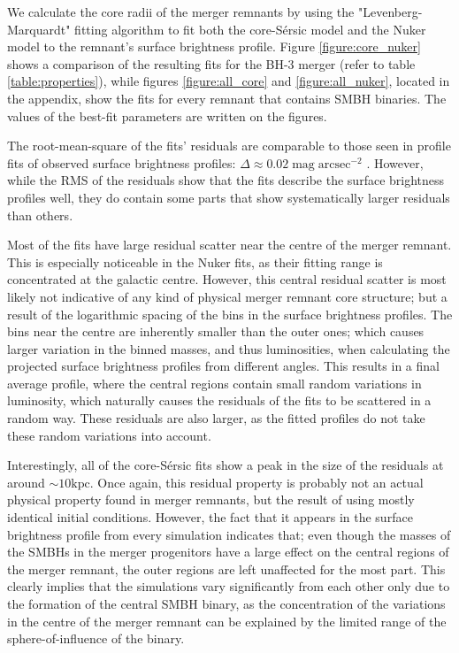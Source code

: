 \documentclass[english, oneside]{HYgradu}
\begin{document}
We calculate the core radii of the merger remnants by using the "Levenberg-Marquardt" fitting algorithm to fit both the core-Sérsic model and the Nuker model to the remnant's surface brightness profile. Figure \ref{figure:core_nuker} shows a comparison of the resulting fits for the BH-3 merger (refer to table \ref{table:properties}), while figures \ref{figure:all_core} and \ref{figure:all_nuker}, located in the appendix, show the fits for every remnant that contains SMBH binaries. The values of the best-fit parameters are written on the figures.

The root-mean-square of the fits' residuals are comparable to those seen in profile fits of observed surface brightness profiles: $\Delta \approx 0.02 \; \mathrm{mag \; arcsec^{-2}}$ \citep{Dullo2012}. However, while the RMS of the residuals show that the fits describe the surface brightness profiles well, they do contain some parts that show systematically larger residuals than others. 

Most of the fits have large residual scatter near the centre of the merger remnant. This is especially noticeable in the Nuker fits, as their fitting range is concentrated at the galactic centre. However, this central residual scatter is most likely not indicative of any kind of physical merger remnant core structure; but a result of the logarithmic spacing of the bins in the surface brightness profiles. The bins near the centre are inherently smaller than the outer ones; which causes larger variation in the binned masses, and thus luminosities, when calculating the projected surface brightness profiles from different angles. This results in a final average profile, where the central regions contain small random variations in luminosity, which naturally causes the residuals of the fits to be scattered in a random way. These residuals are also larger, as the fitted profiles do not take these random variations into account.

Interestingly, all of the core-Sérsic fits show a peak in the size of the residuals at around $\sim 10 \mathrm{kpc}$. Once again, this residual property is probably not an actual physical property found in merger remnants, but the result of using mostly identical initial conditions. However, the fact that it appears in the surface brightness profile from every simulation indicates that; even though the masses of the SMBHs in the merger progenitors have a large effect on the central regions of the merger remnant, the outer regions are left unaffected for the most part. This clearly implies that the simulations vary significantly from each other only due to the formation of the central SMBH binary, as the concentration of the variations in the centre of the merger remnant can be explained by the limited range of the sphere-of-influence of the binary.
\end{document}
